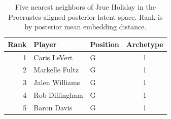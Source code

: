\begin{table}[htbp]
  \centering\small
  \begin{tabular}{rllc}
    \toprule
    Rank & Player & Position & Archetype \\
    \midrule
    1 & Caris LeVert & G & 1 \\
    2 & Markelle Fultz & G & 1 \\
    3 & Jalen Williams & G & 1 \\
    4 & Rob Dillingham & G & 1 \\
    5 & Baron Davis & G & 1 \\
    \bottomrule
  \end{tabular}
  \caption{Five nearest neighbors of Jrue Holiday in the Procrustes-aligned posterior latent space. Rank is by posterior mean embedding distance.}
  \label{tab:Jrue_Holiday_neighbors}
\end{table}

